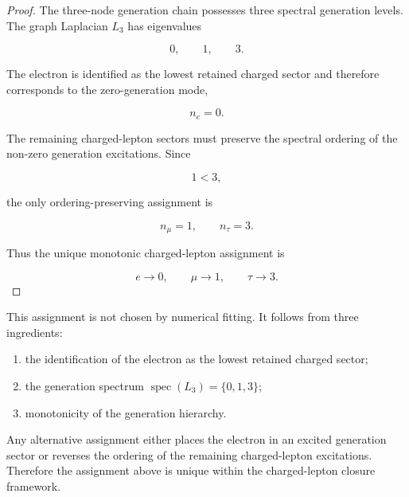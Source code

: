 \documentclass[11pt]{article}
\theoremstyle{definition}
\theoremstyle{remark}
\begin{document}
\begin{proof}

The three-node generation chain possesses three spectral
generation levels. The graph Laplacian \(L_3\) has eigenvalues

\begin{equation}
0,
\qquad
1,
\qquad
3.
\end{equation}

The electron is identified as the lowest retained charged
sector and therefore corresponds to the zero-generation mode,

\begin{equation}
n_e=0.
\end{equation}

The remaining charged-lepton sectors must preserve the spectral
ordering of the non-zero generation excitations. Since

\begin{equation}
1<3,
\end{equation}

the only ordering-preserving assignment is

\begin{equation}
n_\mu=1,
\qquad
n_\tau=3.
\end{equation}

Thus the unique monotonic charged-lepton assignment is

\begin{equation}
e
\longrightarrow
0,
\qquad
\mu
\longrightarrow
1,
\qquad
\tau
\longrightarrow
3.
\end{equation}

\end{proof}

This assignment is not chosen by numerical fitting. It follows
from three ingredients:

\begin{enumerate}
\item the identification of the electron as the lowest retained
charged sector;
\item the generation spectrum
\(\operatorname{spec}(L_3)=\{0,1,3\}\);
\item monotonicity of the generation hierarchy.
\end{enumerate}

Any alternative assignment either places the electron in an
excited generation sector or reverses the ordering of the
remaining charged-lepton excitations. Therefore the assignment
above is unique within the charged-lepton closure framework.
\end{document}
